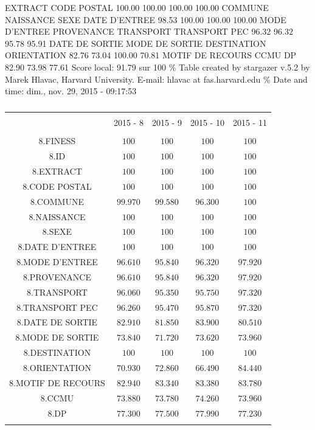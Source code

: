 \documentclass[]{article}
\begin{document}
EXTRACT CODE POSTAL 100.00 100.00 100.00 100.00 COMMUNE NAISSANCE SEXE
DATE D'ENTREE 98.53 100.00 100.00 100.00 MODE D'ENTREE PROVENANCE
TRANSPORT TRANSPORT PEC 96.32 96.32 95.78 95.91 DATE DE SORTIE MODE DE
SORTIE DESTINATION ORIENTATION 82.76 73.04 100.00 70.81 MOTIF DE RECOURS
CCMU DP 82.90 73.98 77.61 Score local: 91.79 sur 100 \% Table created by
stargazer v.5.2 by Marek Hlavac, Harvard University. E-mail: hlavac at
fas.harvard.edu \% Date and time: dim., nov. 29, 2015 - 09:17:53

\begin{table}[!htbp] \centering 
  \caption{} 
  \label{} 
\begin{tabular}{@{\extracolsep{5pt}} ccccc} 
\\[-1.8ex]\hline 
\hline \\[-1.8ex] 
 & 2015 - 8 & 2015 - 9 & 2015 - 10 & 2015 - 11 \\ 
\hline \\[-1.8ex] 
8.FINESS & $100$ & $100$ & $100$ & $100$ \\ 
8.ID & $100$ & $100$ & $100$ & $100$ \\ 
8.EXTRACT & $100$ & $100$ & $100$ & $100$ \\ 
8.CODE POSTAL & $100$ & $100$ & $100$ & $100$ \\ 
8.COMMUNE & $99.970$ & $99.580$ & $96.300$ & $100$ \\ 
8.NAISSANCE & $100$ & $100$ & $100$ & $100$ \\ 
8.SEXE & $100$ & $100$ & $100$ & $100$ \\ 
8.DATE D'ENTREE & $100$ & $100$ & $100$ & $100$ \\ 
8.MODE D'ENTREE & $96.610$ & $95.840$ & $96.320$ & $97.920$ \\ 
8.PROVENANCE & $96.610$ & $95.840$ & $96.320$ & $97.920$ \\ 
8.TRANSPORT & $96.060$ & $95.350$ & $95.750$ & $97.320$ \\ 
8.TRANSPORT PEC & $96.260$ & $95.470$ & $95.870$ & $97.320$ \\ 
8.DATE DE SORTIE & $82.910$ & $81.850$ & $83.900$ & $80.510$ \\ 
8.MODE DE SORTIE & $73.840$ & $71.720$ & $73.620$ & $73.960$ \\ 
8.DESTINATION & $100$ & $100$ & $100$ & $100$ \\ 
8.ORIENTATION & $70.930$ & $72.860$ & $66.490$ & $84.440$ \\ 
8.MOTIF DE RECOURS & $82.940$ & $83.340$ & $83.380$ & $83.780$ \\ 
8.CCMU & $73.880$ & $73.780$ & $74.260$ & $73.960$ \\ 
8.DP & $77.300$ & $77.500$ & $77.990$ & $77.230$ \\ 
\hline \\[-1.8ex] 
\end{tabular} 
\end{table}
\end{document}
